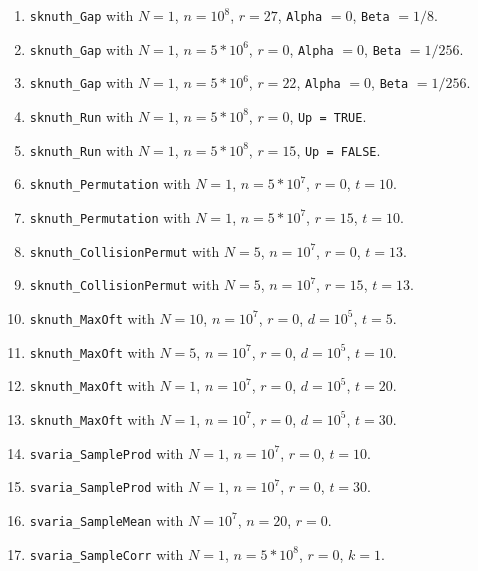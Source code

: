 \begin{enumerate}
  \item {\tt sknuth\_Gap} with $N=1$, $n=10^8$, $r=27$, {\tt Alpha} $=0$,
    {\tt Beta} $=1/8$.

  \item {\tt sknuth\_Gap} with $N=1$, $n=5*10^6$, $r=0$, {\tt Alpha} $=0$,
   {\tt Beta} $=1/256$.

  \item {\tt sknuth\_Gap} with $N=1$, $n=5*10^6$, $r=22$, {\tt Alpha} $=0$,
    {\tt Beta} $=1/256$.

  \item {\tt sknuth\_Run}  with $N=1$, $n=5*10^8$, $r=0$, {\tt Up = TRUE}.

  \item {\tt sknuth\_Run}  with $N=1$, $n=5*10^8$, $r=15$, {\tt Up = FALSE}.

  \item {\tt sknuth\_Permutation} with $N=1$, $n=5*10^7$, $r=0$, $t=10$.

  \item {\tt sknuth\_Permutation} with $N=1$, $n=5*10^7$, $r=15$, $t=10$.

  \item {\tt sknuth\_CollisionPermut} with $N=5$, $n=10^7$, $r=0$, $t=13$.

  \item {\tt sknuth\_CollisionPermut} with $N=5$, $n=10^7$, $r=15$, $t=13$.

  \item {\tt sknuth\_MaxOft} with $N=10$, $n=10^7$, $r=0$, $d=10^5$, $t=5$.

  \item {\tt sknuth\_MaxOft} with $N=5$, $n=10^7$, $r=0$, $d=10^5$, $t=10$.

  \item {\tt sknuth\_MaxOft} with $N=1$, $n=10^7$, $r=0$, $d=10^5$, $t=20$.

  \item {\tt sknuth\_MaxOft} with $N=1$, $n=10^7$, $r=0$, $d=10^5$, $t=30$.

  \item {\tt svaria\_SampleProd} with $N=1$, $n=10^7$, $r=0$, $t=10$.

  \item {\tt svaria\_SampleProd} with $N=1$, $n=10^7$, $r=0$, $t=30$.

  \item {\tt svaria\_SampleMean} with $N=10^7$, $n=20$, $r=0$.

  \item {\tt svaria\_SampleCorr} with $N=1$, $n=5*10^8$, $r=0$, $k=1$.


\end{enumerate}
